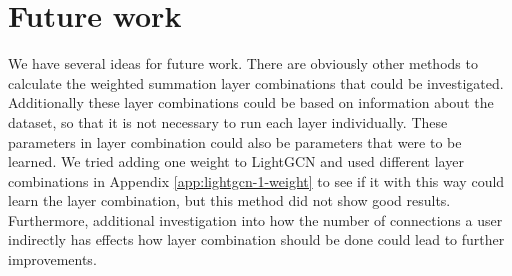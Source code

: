 \section{Future work}
We have several ideas for future work.
There are obviously other methods to calculate the weighted summation layer combinations that could be investigated.
Additionally these layer combinations could be based on information about the dataset, so that it is not necessary to run each layer individually.
These parameters in layer combination could also be parameters that were to be learned.
We tried adding one weight to LightGCN and used different layer combinations in Appendix \ref{app:lightgcn-1-weight} to see if it with this way could learn the layer combination, but this method did not show good results.
Furthermore, additional investigation into how the number of connections a user indirectly has effects how layer combination should be done could lead to further improvements.




